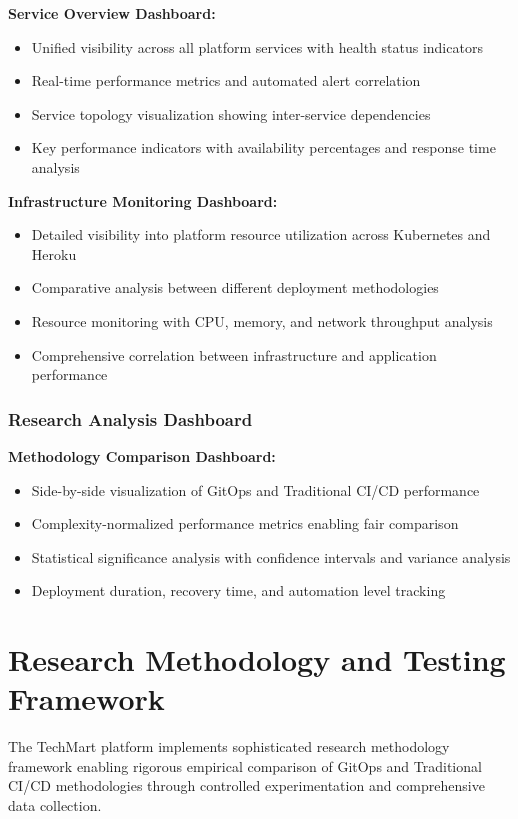\textbf{Service Overview Dashboard:}
\begin{itemize}
\item Unified visibility across all platform services with health status indicators
\item Real-time performance metrics and automated alert correlation
\item Service topology visualization showing inter-service dependencies
\item Key performance indicators with availability percentages and response time analysis
\end{itemize}

\textbf{Infrastructure Monitoring Dashboard:}
\begin{itemize}
\item Detailed visibility into platform resource utilization across Kubernetes and Heroku
\item Comparative analysis between different deployment methodologies
\item Resource monitoring with CPU, memory, and network throughput analysis
\item Comprehensive correlation between infrastructure and application performance
\end{itemize}

\subsubsection{Research Analysis Dashboard}

\textbf{Methodology Comparison Dashboard:}
\begin{itemize}
\item Side-by-side visualization of GitOps and Traditional CI/CD performance
\item Complexity-normalized performance metrics enabling fair comparison
\item Statistical significance analysis with confidence intervals and variance analysis
\item Deployment duration, recovery time, and automation level tracking
\end{itemize}

\section{Research Methodology and Testing Framework}

The TechMart platform implements sophisticated research methodology framework enabling rigorous empirical comparison of GitOps and Traditional CI/CD methodologies through controlled experimentation and comprehensive data collection.

